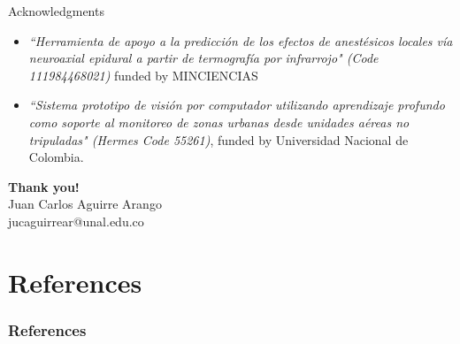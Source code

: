 \documentclass[aspectratio=169]{beamer}
\begin{document}
\begin{frame}{Acknowledgments}

\begin{itemize}
    \setlength\itemsep{1em}
    \item \textit{``Herramienta de apoyo a la predicción de los efectos de anestésicos locales vía neuroaxial epidural a partir de termografía por infrarrojo" (Code 111984468021)} funded by MINCIENCIAS
    \item \textit{``Sistema prototipo de visión por computador utilizando aprendizaje profundo como soporte al monitoreo de zonas urbanas desde unidades aéreas no tripuladas" (Hermes Code 55261)}, funded by Universidad Nacional de Colombia.
\end{itemize}



\begin{center}
	{\Huge{\textbf{\textcolor[rgb]{0.00,0.00,1.00}{Thank you!}}}}\\
	\vspace{0.1cm}
	 Juan Carlos Aguirre Arango\\ \scriptsize{jucaguirrear@unal.edu.co}
\end{center}    
    
\end{frame}


\section{References}

\begin{frame}[allowframebreaks]%
\frametitle{References}
{\tiny 


}
\end{frame}
\end{document}
